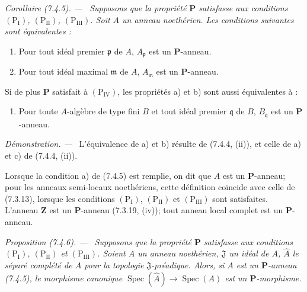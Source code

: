 \documentclass[10pt,oneside]{book}
\newenvironment{proposition}[1][]{%
  \par\medskip\noindent\itshape Proposition (#1). ---\ }{\par}
\newenvironment{corollary}[1][]{%
  \par\medskip\noindent\itshape Corollaire (#1). ---\ }{\par}
\newenvironment{proof}{%
  \par\medskip\noindent\textit{Démonstration. ---\ }}{\par}
\begin{document}
\begin{corollary}[7.4.5]
\label{IV.2.s7.4.5-fr}
Supposons que la propriété $\boldsymbol P$ satisfasse aux conditions
$(\mathrm P_{\mathrm I})$, $(\mathrm P_{\mathrm{II}})$,
$(\mathrm P_{\mathrm{III}})$. Soit $A$ un anneau noethérien. Les conditions
suivantes sont équivalentes :
\begin{enumerate}
\item[\emph{a)}] Pour tout idéal premier $\mathfrak p$ de $A$,
$A_{\mathfrak p}$ est un $\boldsymbol P$-anneau.
\item[\emph{b)}] Pour tout idéal maximal $\mathfrak m$ de $A$,
$A_{\mathfrak m}$ est un $\boldsymbol P$-anneau.
\end{enumerate}
Si de plus $\boldsymbol P$ satisfait à $(\mathrm P_{\mathrm{IV}})$, les
propriétés a) et b) sont aussi équivalentes à :
\begin{enumerate}
\item[\emph{c)}] Pour toute $A$-algèbre de type fini $B$ et tout idéal
premier $\mathfrak q$ de $B$, $B_{\mathfrak q}$ est un
$\boldsymbol P$-anneau.
\end{enumerate}
\end{corollary}

\begin{proof}
L'équivalence de a) et b) résulte de (7.4.4, (ii)), et celle de a) et c) de
(7.4.4, (ii)).

Lorsque la condition a) de (7.4.5) est remplie, on dit que $A$ est un
$\boldsymbol P$-anneau; pour les anneaux semi-locaux noethériens, cette
définition coïncide avec celle de (7.3.13), lorsque les conditions
$(\mathrm P_{\mathrm I})$, $(\mathrm P_{\mathrm{II}})$ et
$(\mathrm P_{\mathrm{III}})$ sont satisfaites. L'anneau $\mathbf Z$ est un
$\boldsymbol P$-anneau (7.3.19, (iv)); tout anneau local complet est un
$\boldsymbol P$-anneau.
\end{proof}

\begin{proposition}[7.4.6]
\label{IV.2.s7.4.6-fr}
Supposons que la propriété $\boldsymbol P$ satisfasse aux conditions
$(\mathrm P_{\mathrm I})$, $(\mathrm P_{\mathrm{II}})$ et
$(\mathrm P_{\mathrm{III}})$. Soient $A$ un anneau noethérien,
$\mathfrak J$ un idéal de $A$, $\widehat A$ le séparé complété de $A$ pour
la topologie $\mathfrak J$-préadique. Alors, si $A$ est un
$\boldsymbol P$-anneau (7.4.5), le morphisme canonique
$\operatorname{Spec}(\widehat A)\to\operatorname{Spec}(A)$ est un
$\boldsymbol P$-morphisme.
\end{proposition}
\end{document}
